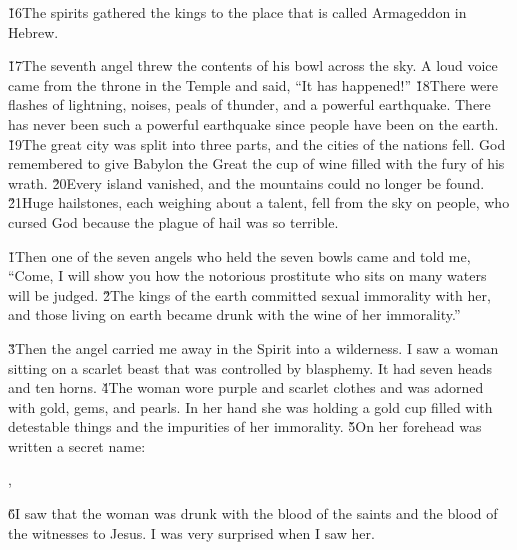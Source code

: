 \v{16}The spirits gathered the kings to the place that is called Armageddon in Hebrew.

\v{17}The seventh angel threw the contents of his bowl across the sky. A loud voice came from the throne in the Temple and said, ``It has happened!'' \v{18}There were flashes of lightning, noises, peals of thunder, and a powerful earthquake. There has never been such a powerful earthquake since people have been on the earth. \v{19}The great city was split into three parts, and the cities of the nations fell. God remembered to give Babylon the Great the cup of wine filled with the fury of his wrath. \v{20}Every island vanished, and the mountains could no longer be found. \v{21}Huge hailstones, each weighing about a talent, fell from the sky on people, who cursed God because the plague of hail was so terrible.

\v{1}Then one of the seven angels who held the seven bowls came and told me, ``Come, I will show you how the notorious prostitute who sits on many waters will be judged. \v{2}The kings of the earth committed sexual immorality with her, and those living on earth became drunk with the wine of her immorality.''

\v{3}Then the angel carried me away in the Spirit into a wilderness. I saw a woman sitting on a scarlet beast that was controlled by blasphemy. It had seven heads and ten horns. \v{4}The woman wore purple and scarlet clothes and was adorned with gold, gems, and pearls. In her hand she was holding a gold cup filled with detestable things and the impurities of her immorality. \v{5}On her forehead was written a secret name:

,



\v{6}I saw that the woman was drunk with the blood of the saints and the blood of the witnesses to Jesus. I was very surprised when I saw her.

